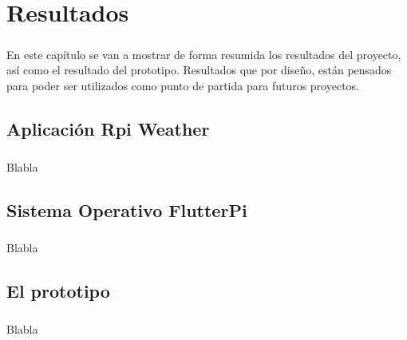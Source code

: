 \chapter{Resultados}\label{sec:resultados}

\paragraph{}En este capítulo se van a mostrar de forma resumida los resultados del proyecto,
así como el resultado del prototipo. Resultados que por diseño, están pensados para
poder ser utilizados como punto de partida para futuros proyectos.

\section{Aplicación Rpi Weather}\label{sec:rpiweather}

\paragraph{}Blabla

\section{Sistema Operativo FlutterPi}\label{sec:flutterpi}

\paragraph{}Blabla

\section{El prototipo}\label{sec:prototipo}

\paragraph{}Blabla

